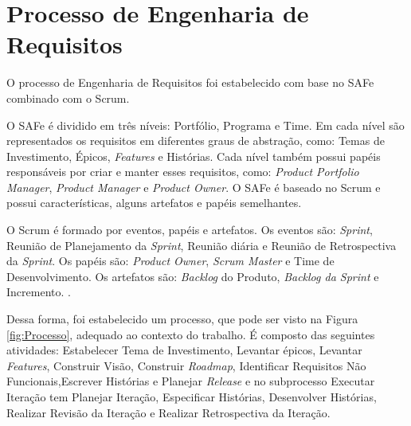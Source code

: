 \chapter[Processo de Engenharia de Requisitos]{Processo de Engenharia de Requisitos}

O processo de Engenharia de Requisitos foi estabelecido com base no SAFe combinado com o Scrum.

O SAFe é dividido em três níveis: Portfólio, Programa e Time. Em cada nível são representados os requisitos
em diferentes graus de abstração, como: Temas de Investimento, Épicos, \textit{Features} e Histórias.
Cada nível também possui papéis responsáveis por criar e manter esses requisitos, como: \textit{Product Portfolio Manager}, 
\textit{Product Manager} e \textit{Product Owner}. O SAFe é baseado no Scrum e
possui características, alguns artefatos e papéis semelhantes. \cite{safe}

% 

O Scrum é formado por eventos, papéis e artefatos. Os eventos são: \textit{Sprint}, Reunião de Planejamento
da \textit{Sprint}, Reunião diária e Reunião de Retrospectiva da \textit{Sprint}. Os papéis são: \textit{Product Owner},
\textit{Scrum Master} e Time de Desenvolvimento. Os artefatos são: \textit{Backlog} do Produto, \textit{Backlog da Sprint} e Incremento. \cite{scrum}.
% 


Dessa forma, foi estabelecido um processo, que pode ser visto na Figura \ref{fig:Processo}, adequado ao contexto do trabalho.
É composto das seguintes atividades: Estabelecer Tema de Investimento, Levantar épicos, Levantar \textit{Features},
Construir Visão, Construir \textit{Roadmap}, Identificar Requisitos Não Funcionais,Escrever
Histórias e Planejar \textit{Release} e no subprocesso Executar Iteração tem Planejar Iteração,
Especificar Histórias, Desenvolver Histórias, Realizar Revisão da Iteraç\~ao e Realizar Retrospectiva da 
Iteração.

